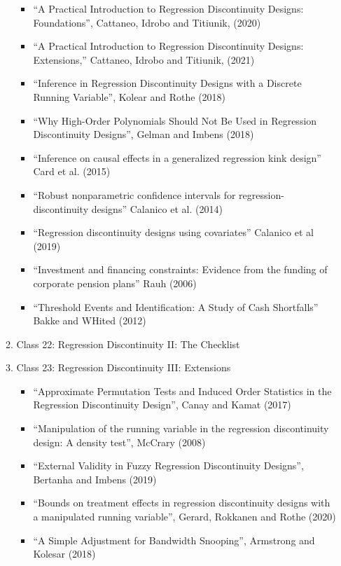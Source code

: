 \documentclass[11pt, a4paper]{article}
\begin{document}
\begin{enumerate}
\begin{enumerate}
\begin{itemize}
    \item ``A Practical Introduction to Regression Discontinuity Designs: Foundations'', Cattaneo, Idrobo and Titiunik, (2020)
    \item ``A Practical Introduction to Regression Discontinuity Designs: Extensions,''  Cattaneo, Idrobo and Titiunik, (2021)
    \item ``Inference in Regression Discontinuity Designs with a Discrete Running Variable'', Kolear and Rothe (2018)
    \item ``Why High-Order Polynomials Should Not Be Used in Regression Discontinuity Designs'', Gelman and Imbens (2018)
    \item ``Inference on causal effects in a generalized regression kink design'' Card et al. (2015)
    \item ``Robust nonparametric confidence intervals for regression-discontinuity designs'' Calanico et al. (2014)
    \item ``Regression discontinuity designs using covariates'' Calanico et al (2019)
    \item  ``Investment and financing constraints: Evidence from the funding of corporate pension plans'' Rauh (2006)
    \item ``Threshold Events and Identification: A Study of Cash Shortfalls'' Bakke and WHited (2012)
    \end{itemize}
  \item Class 22: Regression Discontinuity II: The Checklist
  \item Class 23: Regression Discontinuity III: Extensions
    \begin{itemize}
    \item ``Approximate Permutation Tests and Induced Order Statistics in the Regression Discontinuity Design'', Canay and Kamat (2017)
    \item ``Manipulation of the running variable in the regression discontinuity design: A density test'', McCrary (2008)
    \item ``External Validity in Fuzzy Regression Discontinuity Designs'', Bertanha and Imbens (2019)
    \item ``Bounds on treatment effects in regression discontinuity designs with a manipulated running variable'', Gerard, Rokkanen and Rothe (2020)
    \item ``A Simple Adjustment for Bandwidth Snooping'', Armstrong and Kolesar (2018)
    \end{itemize}     
  \end{enumerate}

\end{enumerate}
\end{document}
